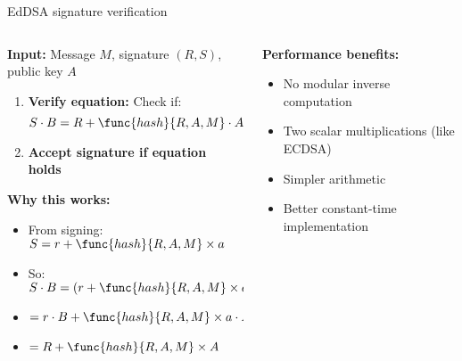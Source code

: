 \documentclass[aspectratio=169, lualatex, handout]{beamer}
\begin{document}
\begin{frame}{EdDSA signature verification}
	\begin{columns}
		\begin{column}{0.6\textwidth}
			\textbf{Input:} Message $M$, signature $(R, S)$, public key $A$
			\begin{enumerate}
				\item \textbf{Verify equation:} Check if:
				      $$S \cdot B = R + \func{hash}{R, A, M} \cdot A$$
				\item \textbf{Accept signature if equation holds}
			\end{enumerate}
			\vspace{0.5cm}
			\textbf{Why this works:}
			\begin{itemize}
				\item From signing: $S = r + \func{hash}{R, A, M} \times a$
				\item So: $S \cdot B = (r + \func{hash}{R, A, M} \times a) \cdot B$
				\item $= r \cdot B + \func{hash}{R, A, M} \times a \cdot B$
				\item $= R + \func{hash}{R, A, M} \times A$
			\end{itemize}
		\end{column}
		\begin{column}{0.4\textwidth}
			\textbf{Performance benefits:}
			\begin{itemize}
				\item No modular inverse computation
				\item Two scalar multiplications (like ECDSA)
				\item Simpler arithmetic
				\item Better constant-time implementation
			\end{itemize}
		\end{column}
	\end{columns}
\end{frame}
\end{document}
